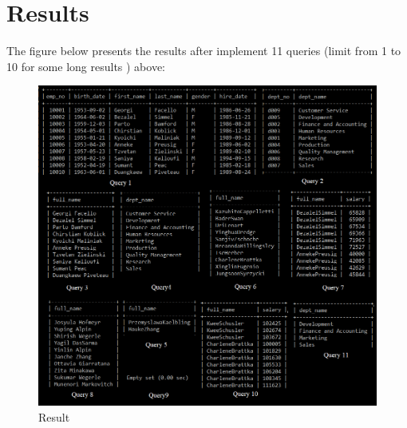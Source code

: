 \documentclass{article}
\begin{document}
\section*{Results}

The figure below presents the results after implement 11 queries (limit from 1 to 10 for some long results
) above:\\
\begin{figure}
\includegraphics[scale = 0.65]{result.PNG}
\caption{Result}
\end{figure}
\end{document}
